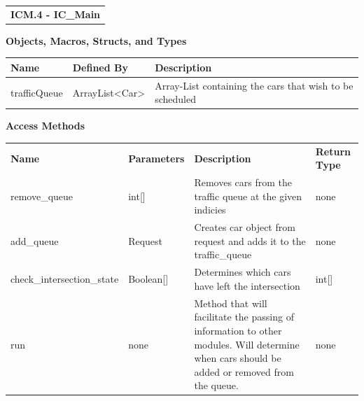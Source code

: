 \documentclass [10pt]{article}
\begin{document}
\begin{longtable}{p{}}
\rowcolor{subsectionC}\textbf{ICM.4 - IC\_Main} \\ 
\end{longtable}
  
 








\textbf{Objects, Macros, Structs, and Types}
\begin{longtable}{ p{ }  p{ } p{}} \\ 

\rowcolor{tableCell} \textbf{Name} & \textbf{Defined By} & \textbf{Description} \\ \hline
\rowcolor{tableCell} trafficQueue& ArrayList<Car>& Array-List containing the cars that wish to be scheduled\\ 
\end{longtable}


\textbf{Access Methods}


\begin{longtable}{ p{ }  p{ } p{} p{}} \\ 

\rowcolor{tableCell} \textbf{Name} & \textbf{Parameters} & \textbf{Description} &\textbf{Return Type} \\
\rowcolor{tableCell}  remove\_queue&int[]&Removes cars from the traffic queue at the given indicies&none \\
\rowcolor{tableCell} add\_queue&Request&Creates car object from request and adds it to the traffic\_queue&none\\
\rowcolor{tableCell} check\_intersection\_state & Boolean[]&Determines which cars have left the intersection&int[]\\
\rowcolor{tableCell}run&none&Method that will facilitate the passing of information to other modules. Will determine when cars should be added or removed from the queue.&none\\




\end{longtable}
\end{document}
